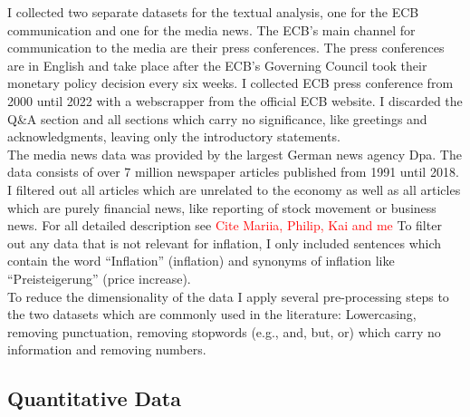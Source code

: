 \documentclass[review]{elsarticle}
\begin{document}
I collected two separate datasets for the textual analysis, one for the ECB communication and one for the media news.
The ECB’s main channel for communication to the media are their press conferences. The press conferences are in English and take place after the ECB’s Governing Council took their monetary policy decision every six weeks. I collected ECB press conference from 2000 until 2022 with a webscrapper
from the official ECB website. I discarded the Q\&A section and all sections which carry no significance, like greetings and acknowledgments, leaving only the introductory statements.
\\
The media news data was provided by the largest German news agency Dpa. The data consists of over 7 million newspaper articles published from 1991 until 2018. I filtered out all articles which are unrelated to the economy as well as all articles which are purely financial news, like reporting of stock movement or business news. For all detailed description see \textcolor{red}{Cite Mariia, Philip, Kai and me}
To filter out any data that is not relevant for inflation, I only included sentences which contain the word “Inflation” (inflation) and synonyms of inflation like “Preisteigerung” (price increase). 
\\
To reduce the dimensionality of the data I apply several pre-processing steps to the two datasets which are commonly used in the literature: Lowercasing, removing punctuation, removing stopwords (e.g., and, but, or) which carry no information and removing numbers.

\subsection{Quantitative Data} \label{sec:Quantitative Data}
\end{document}
